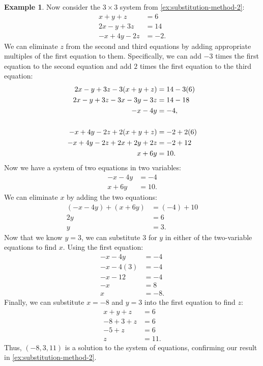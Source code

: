 \documentclass{article}
\theoremstyle{definition}
\newtheorem{example}{Example}
\begin{document}
\begin{example}\label{ex:elimination-method-2}
    Now consider the \(3\times 3\) system from \cref{ex:substitution-method-2}:
\begin{align*}
    x+y+z&=6 \\
    2x-y+3z&=14 \\
    -x+4y-2z&=-2.
\end{align*}
We can eliminate \(z\) from the second and third equations by adding appropriate multiples of the first equation to them. Specifically, we can add \(-3\) times the first equation to the second equation and add \(2\) times the first equation to the third equation:
\begin{align*}
    2x-y+3z-3(x+y+z)&=14-3(6) \\
    2x-y+3z-3x-3y-3z&=14-18 \\
    -x-4y&=-4, \\[\baselineskip]
    -x+4y-2z+2(x+y+z)&=-2+2(6) \\
    -x+4y-2z+2x+2y+2z&=-2+12 \\
    x+6y&=10.
\end{align*}
Now we have a system of two equations in two variables:
\begin{align*}
    -x-4y&=-4 \\
    x+6y&=10.
\end{align*}
We can eliminate \(x\) by adding the two equations:
\begin{align*}
    (-x-4y)+(x+6y)&=(-4)+10 \\
    2y&=6 \\
    y&=3.
\end{align*}
Now that we know \(y=3\), we can substitute \(3\) for \(y\) in either of the two-variable equations to find \(x\). Using the first equation:
\begin{align*}
    -x-4y&=-4 \\
    -x-4(3)&=-4 \\
    -x-12&=-4 \\
    -x&=8 \\
    x&=-8.
\end{align*}
Finally, we can substitute \(x=-8\) and \(y=3\) into the first equation to find \(z\):
\begin{align*}
    x+y+z&=6 \\
    -8+3+z&=6 \\
    -5+z&=6 \\
    z&=11.
\end{align*}
Thus, \((-8, 3, 11)\) is a solution to the system of equations, confirming our result in \cref{ex:substitution-method-2}.
\end{example}
\end{document}
